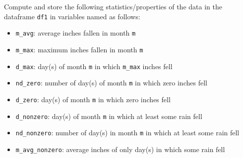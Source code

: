 \documentclass[11pt]{article}
\providecommand{\tightlist}{%
      \setlength{\itemsep}{0pt}\setlength{\parskip}{0pt}}
\begin{document}
    Compute and store the following statistics/properties of the data in the
dataframe \texttt{df1} in variables named as follows:

\begin{itemize}
\tightlist
\item
  \texttt{m\_avg}: average inches fallen in month \texttt{m}
\item
  \texttt{m\_max}: maximum inches fallen in month \texttt{m}
\item
  \texttt{d\_max}: day(s) of month \texttt{m} in which \texttt{m\_max}
  inches fell
\item
  \texttt{nd\_zero}: number of day(s) of month \texttt{m} in which zero
  inches fell
\item
  \texttt{d\_zero}: day(s) of month \texttt{m} in which zero inches fell
\item
  \texttt{d\_nonzero}: day(s) of month \texttt{m} in which at least some
  rain fell
\item
  \texttt{nd\_nonzero}: number of day(s) in month \texttt{m} in which at
  least some rain fell\\
\item
  \texttt{m\_avg\_nonzero}: average inches of only day(s) in which some
  rain fell
\end{itemize}
\end{document}
